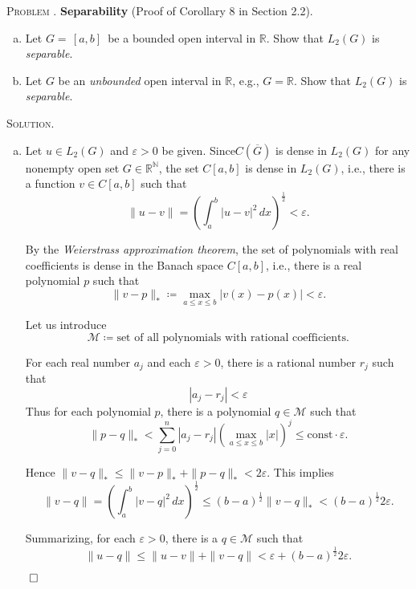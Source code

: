\documentclass[12pt, a4paper, oneside]{ctexart}
\newcounter{problemname}
\newenvironment{problem}{\begin{framed}\stepcounter{problemname}\par\noindent\textsc{Problem \arabic{problemname}. }}{\end{framed}\par}
\newenvironment{solution}{%
	\par\noindent\textsc{Solution. }\ignorespaces
}{%
	\hfill$\qed$\par
}
\begin{document}
	\begin{problem}
		\textbf{Separability}
		(Proof of Corollary 8 in Section 2.2).
		
		\begin{enumerate}[(a)]
			\item Let \( G = \, [a, b] \, \) be a bounded open interval in \( \mathbb{R} \). Show that \( L_2(G) \) is \textit{separable}.
			\item Let \( G \) be an \textit{unbounded} open interval in \( \mathbb{R} \), e.g., \( G = \mathbb{R} \). Show that \( L_2(G) \) is \textit{separable}.
		\end{enumerate}
		
	\end{problem}
	
	\begin{solution}
		\begin{enumerate}[(a)]
			\item Let \( u \in L_2(G) \) and \( \varepsilon > 0 \) be given. Since$C(\overline{G})$ is dense in $L_{2}(G)$ for any nonempty open set $G\in\mathbb{R^{N}}$, the set \( C[a, b] \) is dense in \( L_2(G) \), i.e., there is a function \( v \in C[a, b] \) such that
			\[
			\|u - v\| = \left( \int_a^b |u - v|^2 \, dx \right)^{\frac{1}{2}} < \varepsilon.
			\]
			
			By the \textit{Weierstrass approximation theorem}, the set of polynomials with real coefficients is dense in the Banach space \( C[a, b] \), i.e., there is a real polynomial \( p \) such that
			\[
			\|v - p\|_* \coloneqq \max_{a \leq x \leq b} |v(x) - p(x)| < \varepsilon.
			\]
			
			Let us introduce
			\[
			\mathcal{M} \coloneqq \text{set of all polynomials with rational coefficients}.
			\]
			
			For each real number $a_{j}$ and each $\varepsilon>0$, there is a rational number $r_{j}$ such that\[ |a_{j} - r_{j}| <\varepsilon \]
			Thus for each polynomial \( p \), there is a polynomial \( q \in \mathcal{M} \) such that
			\[
			\|p - q\|_* < \sum_{j=0}^{n}|a_{j} - r_{j}|(\max_{a \leq x \leq b}|x|)^{j}\leq \text{const}\cdot\varepsilon.
			\]
			
			Hence \( \|v - q\|_* \leq \|v - p\|_* + \|p - q\|_* < 2\varepsilon \). This implies
			\[
			\|v - q\| = \left( \int_a^b |v - q|^2 \, dx \right)^{\frac{1}{2}} \leq (b - a)^{\frac{1}{2}} \|v - q\|_* < (b - a)^{\frac{1}{2}} 2\varepsilon.
			\]
			
			Summarizing, for each \( \varepsilon > 0 \), there is a \( q \in \mathcal{M} \) such that
			\[
			\|u - q\| \leq \|u - v\| + \|v - q\| < \varepsilon + (b - a)^{\frac{1}{2}} 2\varepsilon.
			\]
			

\end{enumerate}
\end{solution}
\end{document}
